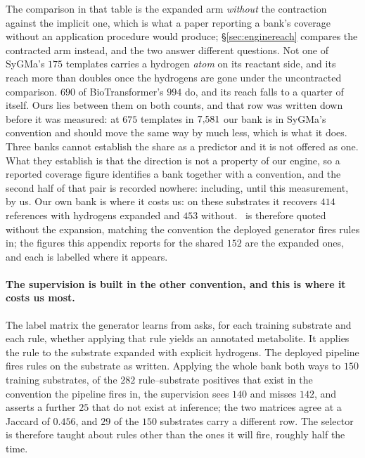The comparison in that table is the expanded arm \emph{without} the contraction against the implicit
one, which is what a paper reporting a bank's coverage without an application procedure would
produce; \S\ref{sec:enginereach} compares the contracted arm instead, and the two answer different
questions. Not one of SyGMa's $175$ templates carries a hydrogen \emph{atom} on its reactant side,
and its reach more than doubles once the hydrogens are gone under the uncontracted comparison. $690$ of BioTransformer's $994$ do, and its
reach falls to a quarter of itself. Ours lies between them on both counts, and that row was written
down before it was measured: at $675$ templates in $7{,}581$ our bank is in SyGMa's convention and
should move the same way by much less, which is what it does. Three banks cannot establish the share
as a predictor and it is not offered as one. What they establish is that the direction is not a
property of our engine, so a reported coverage figure identifies a bank together with a convention,
and the second half of that pair is recorded nowhere: including, until this measurement, by us.
Our own bank is where it costs us: on these substrates it recovers $414$ references with hydrogens
expanded and $453$ without. \ceiling\ is therefore quoted without the expansion, matching the
convention the deployed generator fires rules in; the figures this appendix reports for the shared
$152$ are the expanded ones, and each is labelled where it appears.

\paragraph{The supervision is built in the other convention, and this is where it costs us most.}
The label matrix the generator learns from asks, for each training substrate and each rule, whether
applying that rule yields an annotated metabolite. It applies the rule to the substrate expanded
with explicit hydrogens. The deployed pipeline fires rules on the substrate as written. Applying the
whole bank both ways to $150$ training substrates, of the $282$ rule--substrate positives that exist
in the convention the pipeline fires in, the supervision sees $140$ and misses $142$, and asserts a
further $25$ that do not exist at inference; the two matrices agree at a Jaccard of $0.456$, and
$29$ of the $150$ substrates carry a different row. The selector is therefore taught about rules
other than the ones it will fire, roughly half the time.

